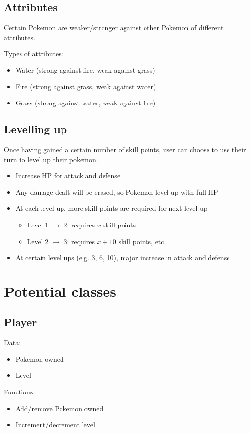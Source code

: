 \documentclass{article}
\begin{document}
  \subsection{Attributes}
  Certain Pokemon are weaker/stronger against other Pokemon of different attributes. \par
  Types of attributes:
  \begin{itemize}
    \item Water (strong against fire, weak against grass)
    \item Fire (strong against grass, weak against water)
    \item Grass (strong against water, weak against fire)
  \end{itemize}
  
  \subsection{Levelling up}
  
  Once having gained a certain number of skill points, user can choose to use their turn to level up their pokemon. \par
  
  \begin{itemize}
    \item Increase HP for attack and defense
    \item Any damage dealt will be erased, so Pokemon level up with full HP
    \item At each level-up, more skill points are required for next level-up
      \begin{itemize}
        \item Level 1 $\to$ 2: requires $x$ skill points
        \item Level 2 $\to$ 3: requires $x+10$ skill points, etc. 
      \end{itemize}
    \item At certain level ups (e.g. 3, 6, 10), major increase in attack and defense
  \end{itemize}
  
  \pagebreak

  \section{Potential classes}
  
  \subsection{Player}
  Data: 
  \begin{itemize}
    \item Pokemon owned
    \item Level 
  \end{itemize}
  Functions:
  \begin{itemize}
    \item Add/remove Pokemon owned
    \item Increment/decrement level
  \end{itemize}
  
\end{document}
